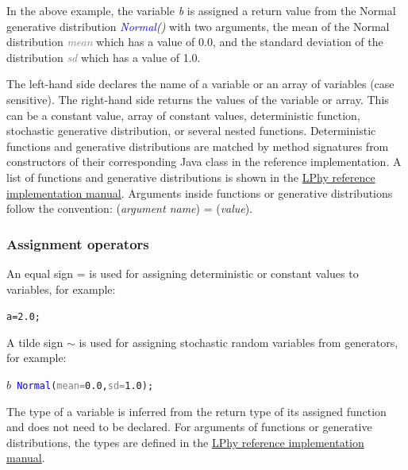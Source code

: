 \documentclass[10pt,letterpaper,table]{article}
\theoremstyle{definition}
\begin{document}
In the above example, the variable \textit{\textcolor{bluishgreen}{b}} is assigned a return value from the Normal generative distribution \textit{\textcolor{blue}{Normal}()} with two arguments, the mean of the Normal distribution \textit{\textcolor{gray}{mean}} which has a value of 0.0, and the standard deviation of the distribution \textit{\textcolor{gray}{sd}} which has a value of 1.0.

The left-hand side declares the name of a variable or an array of variables (case sensitive).
The right-hand side returns the values of the variable or array. This can be a constant value, array of constant values, deterministic function, stochastic generative distribution, or several nested functions.
Deterministic functions and generative distributions are matched by method signatures from constructors of their corresponding Java class in the reference implementation. 
A list of functions and generative distributions is shown in the \href{https://github.com/LinguaPhylo/linguaPhylo/blob/master/lphy/doc/index.md}{LPhy reference implementation manual}.
Arguments inside functions or generative distributions follow the convention: 
(\textit{argument name}) = (\textit{value}).

\subsubsection{Assignment operators}
An equal sign = is used for assigning deterministic or constant values to variables, for example: 
{
  \small
  \begin{listing}
    \begin{alltt}
    a = \textcolor{constant}{2.0};
    \end{alltt}
  \end{listing}
}
\noindent A tilde sign $\sim$ is used for assigning stochastic random variables from generators, for example:  
{
  \small
  \begin{listing}
    \begin{alltt}
    \textcolor{bluishgreen}{\(b\)} ~ \textcolor{blue}{Normal}(\textcolor{gray}{mean=}\textcolor{constant}{0.0}, \textcolor{gray}{sd=}\textcolor{constant}{1.0});
    \end{alltt}
  \end{listing}
}
\noindent The type of a variable is inferred from the return type of its assigned function and does not need to be declared. 
For arguments of functions or generative distributions, the types are defined in the  \href{https://github.com/LinguaPhylo/linguaPhylo/blob/master/lphy/doc/index.md}{LPhy reference implementation manual}. 
\end{document}
